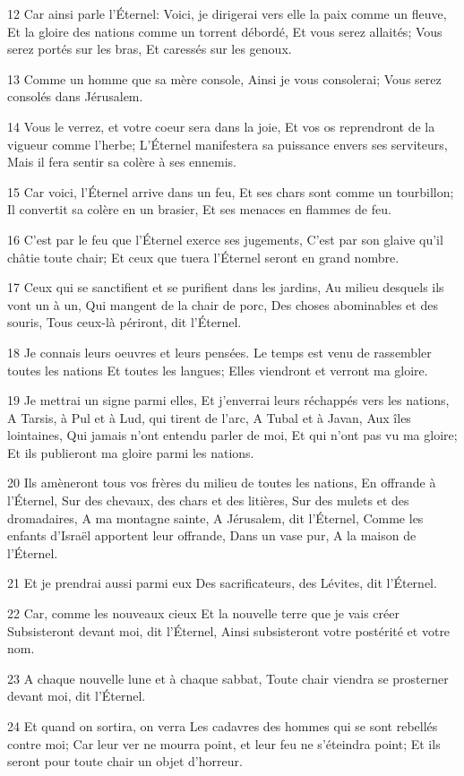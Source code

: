\par 12 Car ainsi parle l'Éternel: Voici, je dirigerai vers elle la paix comme un fleuve, Et la gloire des nations comme un torrent débordé, Et vous serez allaités; Vous serez portés sur les bras, Et caressés sur les genoux.
\par 13 Comme un homme que sa mère console, Ainsi je vous consolerai; Vous serez consolés dans Jérusalem.
\par 14 Vous le verrez, et votre coeur sera dans la joie, Et vos os reprendront de la vigueur comme l'herbe; L'Éternel manifestera sa puissance envers ses serviteurs, Mais il fera sentir sa colère à ses ennemis.
\par 15 Car voici, l'Éternel arrive dans un feu, Et ses chars sont comme un tourbillon; Il convertit sa colère en un brasier, Et ses menaces en flammes de feu.
\par 16 C'est par le feu que l'Éternel exerce ses jugements, C'est par son glaive qu'il châtie toute chair; Et ceux que tuera l'Éternel seront en grand nombre.
\par 17 Ceux qui se sanctifient et se purifient dans les jardins, Au milieu desquels ils vont un à un, Qui mangent de la chair de porc, Des choses abominables et des souris, Tous ceux-là périront, dit l'Éternel.
\par 18 Je connais leurs oeuvres et leurs pensées. Le temps est venu de rassembler toutes les nations Et toutes les langues; Elles viendront et verront ma gloire.
\par 19 Je mettrai un signe parmi elles, Et j'enverrai leurs réchappés vers les nations, A Tarsis, à Pul et à Lud, qui tirent de l'arc, A Tubal et à Javan, Aux îles lointaines, Qui jamais n'ont entendu parler de moi, Et qui n'ont pas vu ma gloire; Et ils publieront ma gloire parmi les nations.
\par 20 Ils amèneront tous vos frères du milieu de toutes les nations, En offrande à l'Éternel, Sur des chevaux, des chars et des litières, Sur des mulets et des dromadaires, A ma montagne sainte, A Jérusalem, dit l'Éternel, Comme les enfants d'Israël apportent leur offrande, Dans un vase pur, A la maison de l'Éternel.
\par 21 Et je prendrai aussi parmi eux Des sacrificateurs, des Lévites, dit l'Éternel.
\par 22 Car, comme les nouveaux cieux Et la nouvelle terre que je vais créer Subsisteront devant moi, dit l'Éternel, Ainsi subsisteront votre postérité et votre nom.
\par 23 A chaque nouvelle lune et à chaque sabbat, Toute chair viendra se prosterner devant moi, dit l'Éternel.
\par 24 Et quand on sortira, on verra Les cadavres des hommes qui se sont rebellés contre moi; Car leur ver ne mourra point, et leur feu ne s'éteindra point; Et ils seront pour toute chair un objet d'horreur.


